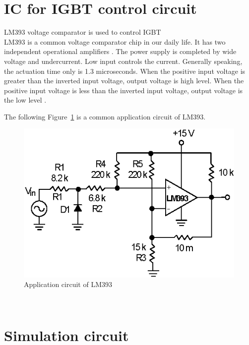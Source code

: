 \section{IC for IGBT control circuit}
\label{sec:IC for IGBT control circuit}
LM393 voltage comparator is used to control IGBT 
\\
LM393 is a common voltage comparator chip in our daily life. It has two independent operational amplifiers \cite{LM393datasheet}. The power supply is completed by wide voltage and undercurrent. Low input controls the current. Generally speaking, the actuation time only is 1.3 microseconds. When the positive input voltage is greater than the inverted input voltage, output voltage is high level. When the positive input voltage is less than the inverted input voltage, output voltage is the low level \cite{nie2012development}. 

The following Figure~\ref{fig:3.2} is a common application circuit of LM393.

\begin{figure}[!ht]
	\centering
	\includegraphics[width=13cm]{grafiken/3.2.eps}
	\caption{Application circuit of LM393} 
	\label{fig:3.2}
\end{figure}
\FloatBarrier
\\
\section{Simulation circuit}
\label{sec:Simulation circuit}

